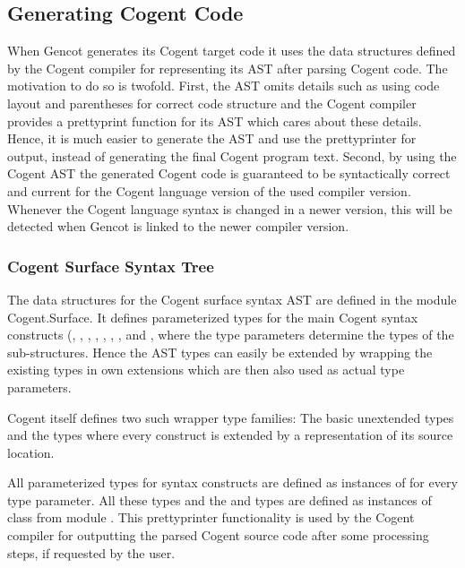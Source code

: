 \subsection{Generating Cogent Code}
\label{impl-ccode-gencog}

When Gencot generates its Cogent target code it uses the data structures defined by the Cogent compiler for representing
its AST after parsing Cogent code. The motivation to do so is twofold. First, the AST omits details such as using code layout
and parentheses for correct code structure and the Cogent compiler provides a prettyprint function for its AST which cares
about these details. Hence, it is much easier to generate the AST and use the prettyprinter for output, instead of generating
the final Cogent program text. Second, by using the Cogent AST the generated Cogent code is guaranteed to be syntactically correct and
current for the Cogent language version of the used compiler version. Whenever the Cogent language syntax is changed
in a newer version, this will be detected when Gencot is linked to the newer compiler version.

\subsubsection{Cogent Surface Syntax Tree}

The data structures for the Cogent surface syntax AST are defined in the module Cogent.Surface. It defines parameterized types
for the main Cogent syntax constructs (, , , , , 
, , and , where the type parameters determine the types of the 
sub-structures. Hence the AST types
can easily be extended by wrapping the existing types in own extensions which are then also used as actual type parameters.

Cogent itself defines two such wrapper type families: The basic unextended types  and the types 
where every construct is extended by a representation of its source location. 

All parameterized types for syntax constructs are defined as instances of  for every type parameter.
All these types and the  and  types are defined as instances of class  from
module . This prettyprinter functionality is used by the Cogent compiler for outputting
the parsed Cogent source code after some processing steps, if requested by the user.

